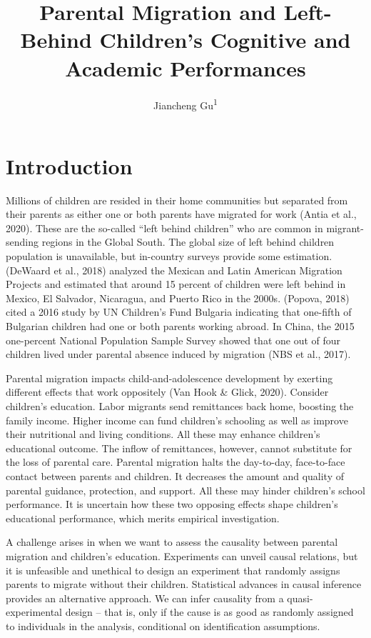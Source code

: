 \documentclass[
  man]{apa7}
\title{Parental Migration and Left-Behind Children's Cognitive and Academic Performances}
\author{Jiancheng Gu\textsuperscript{1}}
\date{}
\affiliation{\vspace{0.5cm}\textsuperscript{1} Faculty of Social Sciences, Vrije Universiteit Amsterdam}
\begin{document}
\maketitle

\hypertarget{introduction}{%
\section{Introduction}\label{introduction}}

Millions of children are resided in their home communities but separated from their parents as either one or both parents have migrated for work (Antia et al., 2020). These are the so-called ``left behind children'' who are common in migrant-sending regions in the Global South. The global size of left behind children population is unavailable, but in-country surveys provide some estimation. (DeWaard et al., 2018) analyzed the Mexican and Latin American Migration Projects and estimated that around 15 percent of children were left behind in Mexico, El Salvador, Nicaragua, and Puerto Rico in the 2000s. (Popova, 2018) cited a 2016 study by UN Children's Fund Bulgaria indicating that one-fifth of Bulgarian children had one or both parents working abroad. In China, the 2015 one-percent National Population Sample Survey showed that one out of four children lived under parental absence induced by migration (NBS et al., 2017).

Parental migration impacts child-and-adolescence development by exerting different effects that work oppositely (Van Hook \& Glick, 2020). Consider children's education. Labor migrants send remittances back home, boosting the family income. Higher income can fund children's schooling as well as improve their nutritional and living conditions. All these may enhance children's educational outcome. The inflow of remittances, however, cannot substitute for the loss of parental care. Parental migration halts the day-to-day, face-to-face contact between parents and children. It decreases the amount and quality of parental guidance, protection, and support. All these may hinder children's school performance. It is uncertain how these two opposing effects shape children's educational performance, which merits empirical investigation.

A challenge arises in when we want to assess the causality between parental migration and children's education. Experiments can unveil causal relations, but it is unfeasible and unethical to design an experiment that randomly assigns parents to migrate without their children. Statistical advances in causal inference provides an alternative approach. We can infer causality from a quasi-experimental design -- that is, only if the cause is as good as randomly assigned to individuals in the analysis, conditional on identification assumptions.
\end{document}
